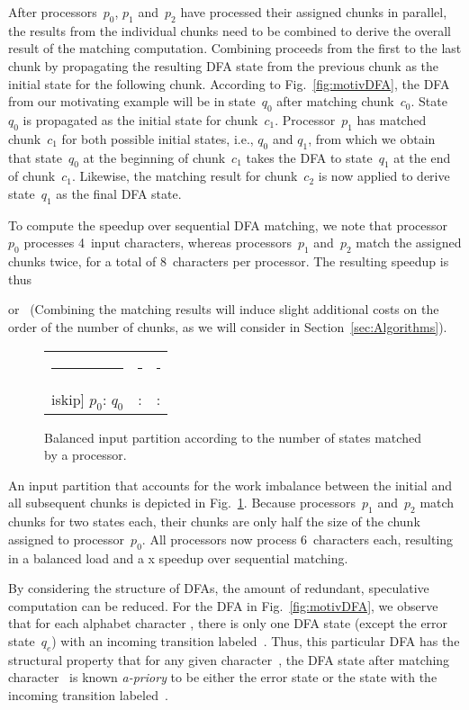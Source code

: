 \documentclass[smallextended]{svjour3}
\newcommand\State[1][{}]{\ensuremath{q_{#1}}}
\newcommand\StartState{\ensuremath{\State[0]}}
\newcommand\ErrorState{\ensuremath{\State[e]}}
\newcommand\Processor[1][{}]{\ensuremath{p_{#1}}}
\newcommand\Chunk[1][{}]{\ensuremath{c_{#1}}}
\begin{document}
After processors~\Processor[0], \Processor[1] and~\Processor[2] have processed their assigned
chunks in parallel, the results from the individual chunks need to be combined to
derive the overall result of the matching computation.
Combining proceeds from the first to the last chunk by propagating the resulting DFA state
from the previous chunk as the initial state for the following chunk. According to
Fig.~\ref{fig:motivDFA}, the DFA from our motivating example will be in state~\State[0] after matching
chunk~\Chunk[0]. State~\State[0] is propagated as the initial state for chunk~\Chunk[1].
Processor~\Processor[1] has matched chunk~\Chunk[1] for both possible initial states, i.e.,
\State[0] and \State[1], from which we obtain that state~\State[0] at the beginning
of chunk~\Chunk[1] takes the DFA to state~\State[1] at the end of chunk~\Chunk[1].
Likewise, the matching result for chunk~\Chunk[2] is now applied to derive state~\State[1]
as the final DFA state.
  
To compute the speedup over sequential DFA matching, we note that
processor~\Processor[0] processes 4~input characters, whereas processors~\Processor[1]
and~\Processor[2] match the assigned chunks
twice, for a total of 8~characters per processor. The resulting speedup is thus

or~ (Combining the matching results will induce slight additional costs on the
order of the number of chunks, as we will consider in Section~\ref{sec:Algorithms}). 

\begin{figure}[H]
 \centering
 \begin{tabular}{lll}
    \rule{21mm}{0pt}&\rule{\colwidth}{0pt}&\rule{\colwidth}{0pt}\\iskip]
    \Processor[0]: \StartState&
    : &
    : 
 \end{tabular}
 \caption{Balanced input partition according to the number of
states matched by a processor.\label{fig:balanced}}
\end{figure}

An input partition that accounts for the work imbalance between the initial and all subsequent
chunks is depicted in Fig.~\ref{fig:balanced}.
Because processors~\Processor[1] and~\Processor[2] match chunks for two states each,
their chunks are only half the size of the chunk assigned to processor~\Processor[0].
All processors now process 6~characters each, resulting in a balanced load and a x speedup
over sequential matching.

By considering the structure of DFAs, the amount of redundant, speculative
computation can be reduced. For the DFA in Fig.~\ref{fig:motivDFA},
we observe that for each alphabet character ,
there is only one DFA state (except the error state~\ErrorState) with an incoming transition labeled~. 
Thus, this particular DFA has the structural property that for any given character~,
the DFA state after matching character~ is known {\em a-priory\/} to be either
the error state or the state with the incoming transition labeled~.
\end{document}
